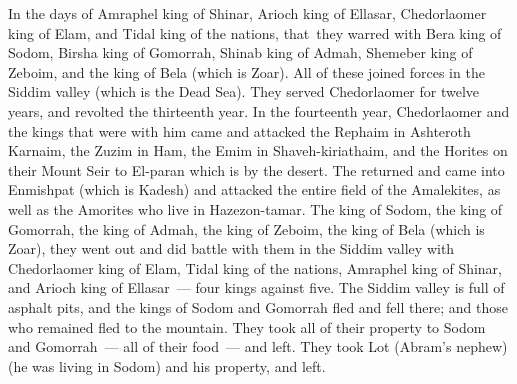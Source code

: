 
\begin{inparaenum}
   In the days of Amraphel king of Shinar, Arioch king of Ellasar, Chedorlaomer king of Elam, and Tidal king of the nations,%
   that\understood\ they warred with Bera king of Sodom, Birsha king of Gomorrah, Shinab king of Admah, Shemeber king of Zeboim, and the king of Bela (which is Zoar).%
   All of these joined forces in the Siddim valley (which is the Dead Sea).%
   They served Chedorlaomer for twelve years, and revolted the thirteenth year.%
   In the fourteenth year, Chedorlaomer and the kings that were with him came and attacked the Rephaim in Ashteroth Karnaim, the Zuzim in Ham, the Emim in Shaveh-kiriathaim,%
   and the Horites on their Mount Seir to El-paran which is by the desert.%
   The returned and came into Enmishpat (which is Kadesh) and attacked the entire field of the Amalekites, as well as the Amorites who live in Hazezon-tamar.%
   The king of Sodom, the king of Gomorrah, the king of Admah, the king of Zeboim, the king of Bela (which is Zoar), they went out and did battle with them in the Siddim valley%
   with Chedorlaomer king of Elam, Tidal king of the nations, Amraphel king of Shinar, and Arioch king of Ellasar~--- four kings against five.%
   The Siddim valley is full of asphalt pits, and the kings of Sodom and Gomorrah fled and fell there; and those who remained fled to the mountain.%
   They took all of their property to Sodom and Gomorrah~--- all of their food~--- and left.%
   They took Lot (Abram's nephew) (he was living in Sodom) and his property, and left.%

\end{inparaenum}
